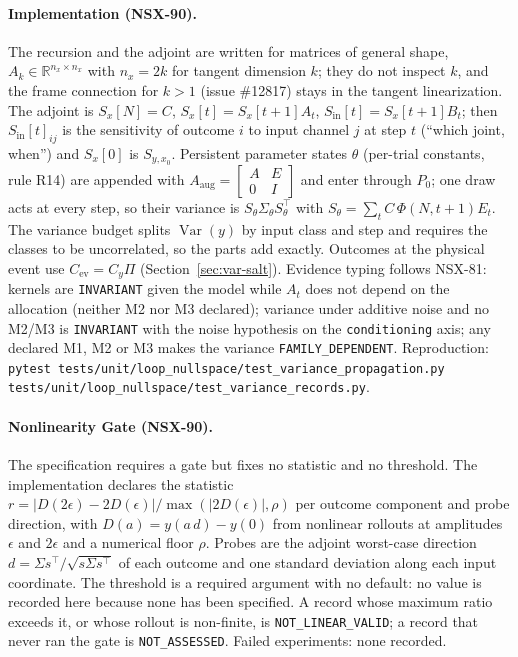 \documentclass[11pt,a4paper]{article}
\newcommand{\R}{\mathbb{R}}
\begin{document}
\paragraph{Implementation (NSX-90).}  The recursion and the adjoint are written
for matrices of general shape, $A_k\in\R^{n_x\times n_x}$ with $n_x=2k$ for
tangent dimension $k$; they do not inspect $k$, and the frame connection for
$k>1$ (issue \#12817) stays in the tangent linearization.  The adjoint is
$S_x[N]=C$, $S_x[t]=S_x[t{+}1]A_t$, $S_{\mathrm{in}}[t]=S_x[t{+}1]B_t$; then
$S_{\mathrm{in}}[t]_{ij}$ is the sensitivity of outcome $i$ to input channel $j$
at step $t$ (``which joint, when'') and $S_x[0]$ is $S_{y,x_0}$.  Persistent
parameter states $\theta$ (per-trial constants, rule R14) are appended with
$A_{\mathrm{aug}}=\left[\begin{smallmatrix}A&E\\0&I\end{smallmatrix}\right]$ and
enter through $P_0$; one draw acts at every step, so their variance is
$S_\theta\Sigma_\theta S_\theta^{\!\top}$ with $S_\theta=\sum_t C\,\Phi(N,t{+}1)E_t$.
The variance budget splits $\operatorname{Var}(y)$ by input class and step and
requires the classes to be uncorrelated, so the parts add exactly.  Outcomes at
the physical event use $C_{\mathrm{ev}}=C_y\Pi$ (Section~\ref{sec:var-salt}).
Evidence typing follows NSX-81: kernels are \texttt{INVARIANT} given the model
while $A_t$ does not depend on the allocation (neither M2 nor M3 declared);
variance under additive noise and no M2/M3 is \texttt{INVARIANT} with the noise
hypothesis on the \texttt{conditioning} axis; any declared M1, M2 or M3 makes
the variance \texttt{FAMILY\_DEPENDENT}.  Reproduction:
\texttt{pytest tests/unit/loop\_nullspace/test\_variance\_propagation.py
tests/unit/loop\_nullspace/test\_variance\_records.py}.

\paragraph{Nonlinearity Gate (NSX-90).}  The specification requires a gate but
fixes no statistic and no threshold.  The implementation declares the statistic
$r=\lvert D(2\epsilon)-2D(\epsilon)\rvert/\max(\lvert2D(\epsilon)\rvert,\rho)$ per
outcome component and probe direction, with $D(a)=y(a\,d)-y(0)$ from nonlinear
rollouts at amplitudes $\epsilon$ and $2\epsilon$ and a numerical floor $\rho$.
Probes are the adjoint worst-case direction $d=\Sigma s^{\!\top}/\sqrt{s\Sigma
s^{\!\top}}$ of each outcome and one standard deviation along each input
coordinate.  The threshold is a required argument with no default: no value is
recorded here because none has been specified.  A record whose maximum ratio
exceeds it, or whose rollout is non-finite, is \texttt{NOT\_LINEAR\_VALID}; a
record that never ran the gate is \texttt{NOT\_ASSESSED}.  Failed experiments:
none recorded.
\end{document}
